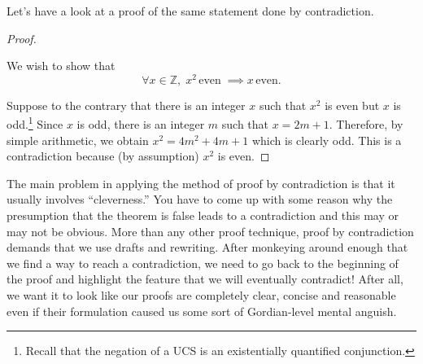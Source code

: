 \documentclass[10pt,]{book}
\theoremstyle{plain}
\theoremstyle{definition}
\theoremstyle{definition}
\numberwithin{equation}{section}
\newcommand{\Integers}{{\mathbb Z}}
\begin{document}
    Let's have a look at a proof of the same statement done by contradiction.
\begin{proof}\hypertarget{proof-13}{}

      We wish to show that
      \begin{equation*}
        \forall x \in \Integers, \; x^2 \, \mbox{even}  \; 
        \implies x \, \mbox{even} .
      \end{equation*}
\par

      Suppose to the contrary that there is an integer \(x\) such that
      \(x^2\) is even but \(x\) is odd.\footnote{Recall that the negation of 
      a UCS is an existentially quantified conjunction.\label{fn-22}} Since \(x\) is
      odd, there is an integer \(m\) such that \(x=2m+1\). Therefore, by
      simple arithmetic, we obtain \(x^2 = 4m^2+4m+1\) which is clearly odd.
      This is a contradiction because (by assumption) \(x^2\) is even.
\end{proof}
\par

    The main problem in applying the method of proof by contradiction
    is that it usually involves ``cleverness.'' You have to come up
    with some reason why the presumption that the theorem is false leads
    to a contradiction \textemdash{} and this may or may not be obvious. More than
    any other proof technique, proof by contradiction demands that we use
    drafts and rewriting. After monkeying around enough that we find a
    way to reach a contradiction, we need to go back to the beginning
    of the proof and highlight the feature that we will eventually contradict!
    After all, we want it to look like our proofs are completely clear, concise
    and reasonable even if their formulation caused us some sort
    of Gordian-level mental anguish.
\par
\end{document}
